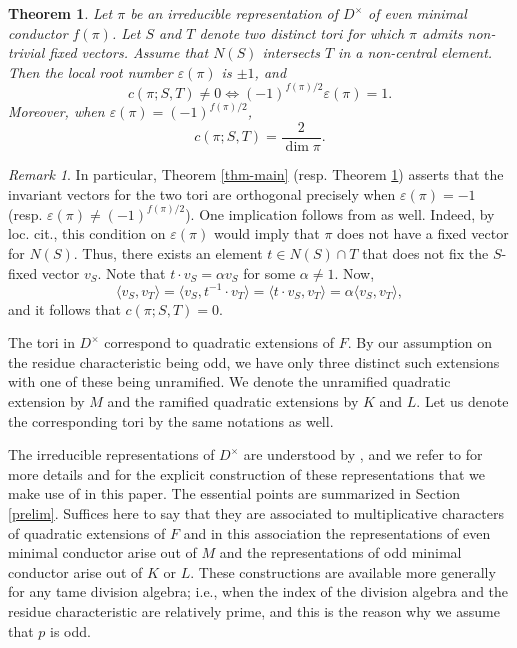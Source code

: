 \documentclass[12pt]{amsart}
\newtheorem{theorem}{Theorem}[section] %
\theoremstyle{definition}
\theoremstyle{remark}
\newtheorem{remark}{Remark}
\begin{document}
\begin{theorem}\label{thm-main-1}
Let $\pi$ be an irreducible representation of $D^\times$ of even minimal conductor $f(\pi)$. Let $S$ and $T$ denote two distinct tori for which $\pi$ admits non-trivial fixed vectors. Assume that $N(S)$ intersects $T$ in a non-central element. Then the local root number $\varepsilon(\pi)$ is $\pm 1$, and 
\[c(\pi; S, T) \neq 0 \iff (-1)^{f(\pi)/2}\varepsilon(\pi) = 1.\]
Moreover, when $\varepsilon(\pi) = (-1)^{f(\pi)/2}$,
\[c(\pi; S, T) = \frac{2}{\dim \pi}.\]
\end{theorem}

\begin{remark}\label{dp}
In particular, Theorem \ref{thm-main} (resp. Theorem \ref{thm-main-1}) asserts that the invariant vectors for the two tori are orthogonal precisely when $\varepsilon(\pi) = -1$ (resp. $\varepsilon(\pi) \neq (-1)^{f(\pi)/2}$). One implication follows from \cite[Theorem 4]{pra96} as well. Indeed, by loc. cit., this condition on $\varepsilon(\pi)$ would imply that $\pi$ does not have a fixed vector for $N(S)$. Thus, there exists an element $t \in N(S) \cap T$ that  does not fix the $S$-fixed vector $v_S$. Note that $t \cdot v_S = \alpha v_S$ for some $\alpha \neq 1$. Now,
\[\langle v_S, v_T \rangle = \langle v_S, t^{-1} \cdot v_T \rangle = \langle t \cdot v_S, v_T \rangle = \alpha  \langle v_S, v_T \rangle,\]
and it follows that $c(\pi; S, T) = 0$. 
\end{remark}

The tori in $D^\times$ correspond to quadratic extensions of $F$. By our assumption on the residue characteristic being odd, we have only three distinct such extensions with one of these being unramified. We denote the unramified quadratic extension by $M$ and the ramified quadratic extensions by $K$ and $L$. Let us denote the corresponding tori by the same notations as well. 

The irreducible representations of $D^\times$ are understood by \cite{gg68,ch77,how77b,how77a}, and we refer to \cite{gk80,kz80,bf83} for more details and for the explicit construction of these representations that we make use of in this paper. The essential points are summarized in Section \ref{prelim}. Suffices here to say that they are associated to multiplicative characters of quadratic extensions of $F$ and in this association the representations of even minimal conductor arise out of $M$ and the representations of odd minimal conductor arise out of $K$ or $L$. These constructions are available more generally for any tame division algebra; i.e., when the index of the division algebra and the residue characteristic are relatively prime, and this is the reason why we assume that $p$ is odd. 
\end{document}
